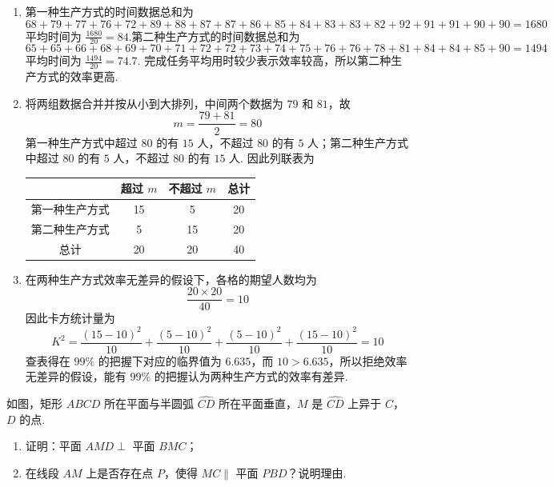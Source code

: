 \begin{solution}
\begin{enumerate}
    \item 第一种生产方式的时间数据总和为
    \[
    68+79+77+76+72+89+88+87+87+86+85+84+83+83+82+92+91+91+90+90=1680
    \]
    平均时间为 \(\frac{1680}{20}=84\).第二种生产方式的时间数据总和为
    \[
    65+65+66+68+69+70+71+72+72+73+74+75+76+76+78+81+84+84+85+90=1494
    \]
    平均时间为 \(\frac{1494}{20}=74.7\). 完成任务平均用时较少表示效率较高，所以第二种生产方式的效率更高.
    \item 将两组数据合并并按从小到大排列，中间两个数据为 \(79\) 和 \(81\)，故
    \[
    m=\frac{79+81}{2}=80
    \]
    第一种生产方式中超过 \(80\) 的有 \(15\) 人，不超过 \(80\) 的有 \(5\) 人；第二种生产方式中超过 \(80\) 的有 \(5\) 人，不超过 \(80\) 的有 \(15\) 人. 因此列联表为

    \begin{center}
    \begin{tabular}{c|ccc}
     & 超过 \(m\) & 不超过 \(m\) & 总计 \\
    \hline
    第一种生产方式 & 15 & 5 & 20 \\
    第二种生产方式 & 5 & 15 & 20 \\
    \hline
    总计 & 20 & 20 & 40 \\
    \end{tabular}
    \end{center}

    \item 在两种生产方式效率无差异的假设下，各格的期望人数均为
    \[
    \frac{20\times20}{40}=10
    \]
    因此卡方统计量为
    \[
    K^2=\frac{(15-10)^2}{10}+\frac{(5-10)^2}{10}
    +\frac{(5-10)^2}{10}+\frac{(15-10)^2}{10}=10
    \]
    查表得在 \(99\%\) 的把握下对应的临界值为 \(6.635\)，而 \(10>6.635\)，所以拒绝效率无差异的假设，能有 \(99\%\) 的把握认为两种生产方式的效率有差异.
\end{enumerate}
\end{solution}

\begin{problem}
如图，矩形 \(ABCD\) 所在平面与半圆弧 \(\widehat{CD}\) 所在平面垂直，\(M\) 是 \(\widehat{CD}\) 上异于 \(C\)，\(D\) 的点.

\begin{enumerate}
    \item 证明：平面 \(AMD\perp\) 平面 \(BMC\)；
    \item 在线段 \(AM\) 上是否存在点 \(P\)，使得 \(MC\parallel\) 平面 \(PBD\)？说明理由.
\end{enumerate}

\end{problem}

